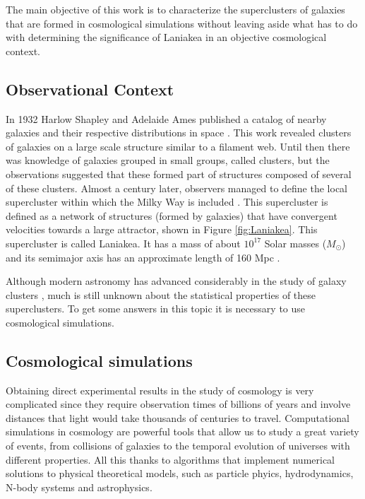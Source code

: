 \documentclass[a4paper,fleqn,usenatbib]{mnras}
\begin{document}
The main objective of this work is to characterize the superclusters of galaxies that are formed in cosmological simulations without leaving aside what has to do with determining the significance of Laniakea in an objective cosmological context.


\subsection{Observational Context}
In 1932 Harlow Shapley and Adelaide Ames published a catalog of nearby galaxies and their respective distributions in space \cite{catalogoRevisado}.  This work revealed clusters of galaxies on a large scale structure similar to a filament web. Until then there was knowledge of galaxies grouped in small groups, called clusters, but the observations suggested that these formed part of structures composed of several of these clusters. Almost a century later, observers managed to define the local supercluster within which the Milky Way is included \cite{tully_laniakea_2014}. 
This supercluster is defined as a network of structures (formed by galaxies) that have convergent velocities towards a large attractor, shown in Figure \ref{fig:Laniakea}. This supercluster is called Laniakea. It has a mass of about $10^{17}$ Solar masses ($M_{\odot}$) and its semimajor axis has an approximate length of 160 Mpc \cite{NatureTully}.

Although modern astronomy has advanced considerably in the study of galaxy clusters \cite{TheDeepUniverse}, much is still unknown about the statistical properties of these superclusters. To get some answers in this topic it is necessary to use cosmological simulations.

\subsection{Cosmological simulations}
Obtaining direct experimental results in the study of cosmology is very complicated since they require observation times of billions of years and involve distances that light would take thousands of centuries to travel. Computational simulations in cosmology are powerful tools that allow us to study a great variety of events, from collisions of galaxies to the temporal evolution of  universes with different properties. All this thanks to algorithms that implement numerical solutions to physical theoretical models, such as particle phyics, hydrodynamics, N-body systems and astrophysics.
\end{document}
